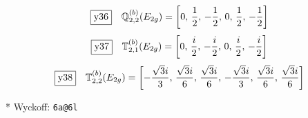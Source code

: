 \documentclass[fleqn,10pt,landscape]{jsarticle}
\begin{document}
\begin{dmath*}
\fbox{y36}\quad \mathbb{Q}_{2,2}^{(b)}(E_{2g})=\left[ 0,\, \frac{1}{2},\, - \frac{1}{2},\, 0,\, \frac{1}{2},\, - \frac{1}{2} \right]
\end{dmath*}
\begin{dmath*}
\fbox{y37}\quad \mathbb{T}_{2,1}^{(b)}(E_{2g})=\left[ 0,\, \frac{i}{2},\, - \frac{i}{2},\, 0,\, \frac{i}{2},\, - \frac{i}{2} \right]
\end{dmath*}
\begin{dmath*}
\fbox{y38}\quad \mathbb{T}_{2,2}^{(b)}(E_{2g})=\left[ - \frac{\sqrt{3} i}{3},\, \frac{\sqrt{3} i}{6},\, \frac{\sqrt{3} i}{6},\, - \frac{\sqrt{3} i}{3},\, \frac{\sqrt{3} i}{6},\, \frac{\sqrt{3} i}{6} \right]
\end{dmath*}
\vspace{5mm}

\noindent ** Wyckoff: \texttt{6a@6l}
\end{document}
